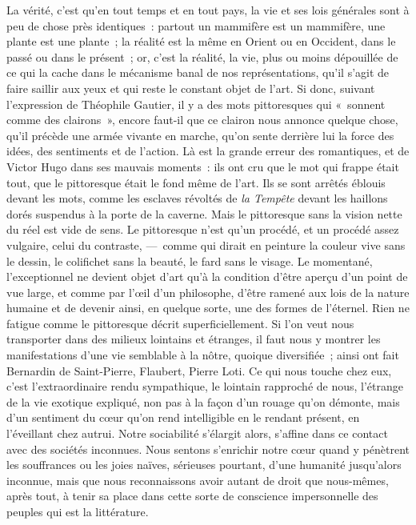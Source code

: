 \documentclass[french,twoside]{book} %
\begin{document}
La vérité, c’est qu’en tout temps et en tout pays, la vie et ses lois générales sont à peu de chose près identiques : partout un mammifère est un mammifère, une plante est une plante ; la réalité est la même en Orient ou en Occident, dans le passé ou dans le présent ; or, c’est la réalité, la vie, plus ou moins dépouillée de ce qui la cache dans le mécanisme banal de nos représentations, qu’il s’agit de faire saillir aux yeux et qui reste le constant objet de l’art. Si donc, suivant l’expression de Théophile Gautier, il y a des mots pittoresques qui « sonnent comme des clairons », encore faut-il que ce clairon nous annonce quelque chose, qu’il précède une armée vivante en marche, qu’on sente derrière lui la force des idées, des sentiments et de l’action. Là est la grande erreur des romantiques, et de Victor Hugo dans ses mauvais moments : ils ont cru que le mot qui frappe était tout, que le pittoresque était le fond même de l’art. Ils se sont arrêtés éblouis devant les mots, comme les esclaves révoltés de \emph{la Tempête} devant les haillons dorés suspendus à la porte de la caverne. Mais le pittoresque sans la vision nette du réel est vide de sens. Le pittoresque n’est qu’un procédé, et un procédé assez vulgaire, celui du contraste, — comme qui dirait en peinture la couleur vive sans le dessin, le colifichet sans la beauté, le fard sans le visage. Le momentané, l’exceptionnel ne devient objet d’art qu’à la condition d’être aperçu d’un point de vue large, et comme par l’œil d’un philosophe, d’être ramené aux lois de la nature humaine et de devenir ainsi, en quelque sorte, une des formes de l’éternel. Rien ne fatigue comme le pittoresque décrit superficiellement. Si l’on veut nous transporter dans des milieux lointains et étranges, il faut nous y montrer les manifestations d’une vie semblable à la nôtre, quoique diversifiée ; ainsi ont fait Bernardin de Saint-Pierre, Flaubert, Pierre Loti. Ce qui nous touche chez eux, c’est l’extraordinaire rendu sympathique, le lointain rapproché de nous, l’étrange de la vie exotique expliqué, non pas à la façon d’un rouage qu’on démonte, mais d’un sentiment du cœur qu’on rend intelligible en le rendant présent, en l’éveillant chez autrui. Notre sociabilité s’élargit alors, s’affine dans ce contact avec des sociétés inconnues. Nous sentons s’enrichir notre cœur quand y pénètrent les souffrances ou les joies naïves, sérieuses pourtant, d’une humanité jusqu’alors inconnue, mais que nous reconnaissons avoir autant de droit que nous-mêmes, après tout, à tenir sa place dans cette sorte de conscience impersonnelle des peuples qui est la littérature.
\end{document}
